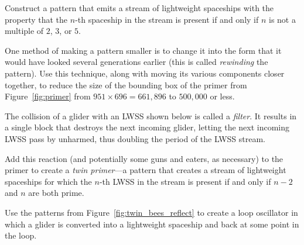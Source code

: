 \begin{multicols}{2}
\mfilbreak


\begin{problem}\label{exer:period_not_235_gun}
	Construct a pattern that emits a stream of lightweight spaceships with the property that the $n$-th spaceship in the stream is present if and only if $n$ is not a multiple of $2$, $3$, or $5$.
\end{problem}


\mfilbreak


\begin{problem}\label{exer:rewind_primer}
	One method of making a pattern smaller is to change it into the form that it would have looked several generations earlier (this is called \emph{rewinding} the pattern). Use this technique, along with moving its various components closer together, to reduce the size of the bounding box of the primer from Figure~\ref{fig:primer} from $951 \times 696 = 661,896$ to $500,000$ or less.
\end{problem}


\mfilbreak


\begin{problem}\label{exer:twin_primer}
	The collision of a glider with an LWSS shown below is called a \emph{filter}. It results in a single block that destroys the next incoming glider, letting the next incoming LWSS pass by unharmed, thus doubling the period of the LWSS stream.
	
	Add this reaction (and potentially some guns and eaters, as necessary) to the primer to create a \emph{twin primer}---a pattern that creates a stream of lightweight spaceships for which the $n$-th LWSS in the stream is present if and only if $n-2$ and $n$ are both prime.

	\begin{center}
	\end{center}
\end{problem}


\mfilbreak


\begin{problem}\label{exer:twin_bees_loop}
	Use the patterns from Figure~\ref{fig:twin_bees_reflect} to create a loop oscillator in which a glider is converted into a lightweight spaceship and back at some point in the loop.
\end{problem}



\end{multicols}
